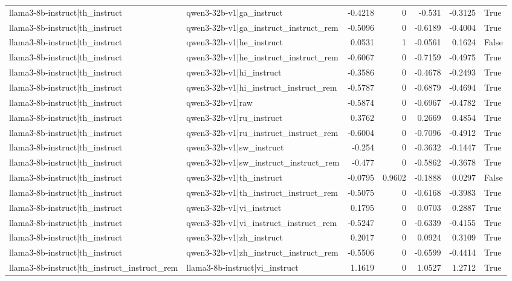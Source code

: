 \begin{table}
\begin{tabular}{l l r r r r l}
llama3-8b-instruct|th_instruct & qwen3-32b-v1|ga_instruct & -0.4218 & 0 & -0.531 & -0.3125 & True \\
llama3-8b-instruct|th_instruct & qwen3-32b-v1|ga_instruct_instruct_rem & -0.5096 & 0 & -0.6189 & -0.4004 & True \\
llama3-8b-instruct|th_instruct & qwen3-32b-v1|he_instruct & 0.0531 & 1 & -0.0561 & 0.1624 & False \\
llama3-8b-instruct|th_instruct & qwen3-32b-v1|he_instruct_instruct_rem & -0.6067 & 0 & -0.7159 & -0.4975 & True \\
llama3-8b-instruct|th_instruct & qwen3-32b-v1|hi_instruct & -0.3586 & 0 & -0.4678 & -0.2493 & True \\
llama3-8b-instruct|th_instruct & qwen3-32b-v1|hi_instruct_instruct_rem & -0.5787 & 0 & -0.6879 & -0.4694 & True \\
llama3-8b-instruct|th_instruct & qwen3-32b-v1|raw & -0.5874 & 0 & -0.6967 & -0.4782 & True \\
llama3-8b-instruct|th_instruct & qwen3-32b-v1|ru_instruct & 0.3762 & 0 & 0.2669 & 0.4854 & True \\
llama3-8b-instruct|th_instruct & qwen3-32b-v1|ru_instruct_instruct_rem & -0.6004 & 0 & -0.7096 & -0.4912 & True \\
llama3-8b-instruct|th_instruct & qwen3-32b-v1|sw_instruct & -0.254 & 0 & -0.3632 & -0.1447 & True \\
llama3-8b-instruct|th_instruct & qwen3-32b-v1|sw_instruct_instruct_rem & -0.477 & 0 & -0.5862 & -0.3678 & True \\
llama3-8b-instruct|th_instruct & qwen3-32b-v1|th_instruct & -0.0795 & 0.9602 & -0.1888 & 0.0297 & False \\
llama3-8b-instruct|th_instruct & qwen3-32b-v1|th_instruct_instruct_rem & -0.5075 & 0 & -0.6168 & -0.3983 & True \\
llama3-8b-instruct|th_instruct & qwen3-32b-v1|vi_instruct & 0.1795 & 0 & 0.0703 & 0.2887 & True \\
llama3-8b-instruct|th_instruct & qwen3-32b-v1|vi_instruct_instruct_rem & -0.5247 & 0 & -0.6339 & -0.4155 & True \\
llama3-8b-instruct|th_instruct & qwen3-32b-v1|zh_instruct & 0.2017 & 0 & 0.0924 & 0.3109 & True \\
llama3-8b-instruct|th_instruct & qwen3-32b-v1|zh_instruct_instruct_rem & -0.5506 & 0 & -0.6599 & -0.4414 & True \\
llama3-8b-instruct|th_instruct_instruct_rem & llama3-8b-instruct|vi_instruct & 1.1619 & 0 & 1.0527 & 1.2712 & True \\

\end{tabular}
\end{table}
